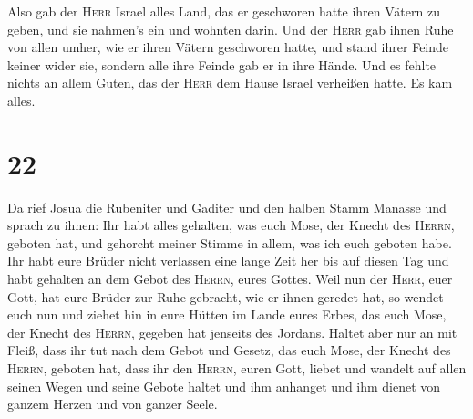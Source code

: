  Also gab der \textsc{Herr} Israel alles Land, das er
geschworen hatte ihren Vätern zu geben, und sie nahmen's ein und wohnten
darin.  Und der \textsc{Herr} gab ihnen Ruhe von allen
umher, wie er ihren Vätern geschworen hatte, und stand ihrer Feinde
keiner wider sie, sondern alle ihre Feinde gab er in ihre Hände.
 Und es fehlte nichts an allem Guten, das der
\textsc{Herr} dem Hause Israel verheißen hatte. Es kam alles.

\hypertarget{section-21}{%
\section{22}\label{section-21}}

 Da rief Josua die Rubeniter und Gaditer und den halben
Stamm Manasse  und sprach zu ihnen: Ihr habt alles
gehalten, was euch Mose, der Knecht des \textsc{Herrn}, geboten hat, und
gehorcht meiner Stimme in allem, was ich euch geboten habe.
 Ihr habt eure Brüder nicht verlassen eine lange Zeit her
bis auf diesen Tag und habt gehalten an dem Gebot des \textsc{Herrn},
eures Gottes.  Weil nun der \textsc{Herr}, euer Gott, hat
eure Brüder zur Ruhe gebracht, wie er ihnen geredet hat, so wendet euch
nun und ziehet hin in eure Hütten im Lande eures Erbes, das euch Mose,
der Knecht des \textsc{Herrn}, gegeben hat jenseits des Jordans.
 Haltet aber nur an mit Fleiß, dass ihr tut nach dem Gebot
und Gesetz, das euch Mose, der Knecht des \textsc{Herrn}, geboten hat,
dass ihr den \textsc{Herrn}, euren Gott, liebet und wandelt auf allen
seinen Wegen und seine Gebote haltet und ihm anhanget und ihm dienet von
ganzem Herzen und von ganzer Seele.

